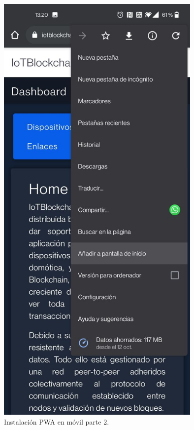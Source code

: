 \begin{figure}[ht!]
  \centering
  \includegraphics[width=10cm]{imagenes/desarrollo/web/pwa/instalacion_pwa_movil2}
  \caption{Instalación PWA en móvil parte 2.}
  \label{fig:instalacion-pwa-movil2}
\end{figure}

